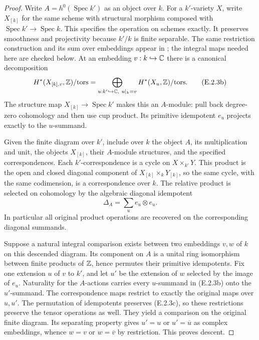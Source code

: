 \begin{proof}
Write $A=h^0(\operatorname{Spec}k')$ as an object over $k$. For a $k'$-variety $X$, write $X_{[k]}$ for the same scheme with structural morphism composed with $\operatorname{Spec}k'\to\operatorname{Spec}k$. This specifies the operation on schemes exactly. It preserves smoothness and projectivity because $k'/k$ is finite separable. The same restriction construction and its sum over embeddings appear in \cite[Example 0.1.1, p.~314, and (0.5.1), p.~316]{Deligne1979}; the integral maps needed here are checked below. At an embedding $v:k\hookrightarrow\mathbb C$ there is a canonical decomposition
\[
 H^*(X_{[k],v},\mathbb Z)/\mathrm{tors}
   =\bigoplus_{u:k'\hookrightarrow\mathbb C,\ u|_k=v}
                   H^*(X_u,\mathbb Z)/\mathrm{tors}.
 \tag{E.2.3b}
\]
The structure map $X_{[k]}\to\operatorname{Spec}k'$ makes this an $A$-module: pull back degree-zero cohomology and then use cup product. Its primitive idempotent $e_u$ projects exactly to the $u$-summand.

Given the finite diagram over $k'$, include over $k$ the object $A$, its multiplication and unit, the objects $X_{[k]}$, their $A$-module structures, and the specified correspondences. Each $k'$-correspondence is a cycle on $X\times_{k'}Y$. This product is the open and closed diagonal component of $X_{[k]}\times_kY_{[k]}$, so the same cycle, with the same codimension, is a correspondence over $k$. The relative product is selected on cohomology by the algebraic diagonal idempotent
\[
 \Delta_A=\sum_u e_u\otimes e_u.
 \tag{E.2.3c}
\]
In particular all original product operations are recovered on the corresponding diagonal summands.

Suppose a natural integral comparison exists between two embeddings $v,w$ of $k$ on this descended diagram. Its component on $A$ is a unital ring isomorphism between finite products of $\mathbb Z$, hence permutes their primitive idempotents. Fix one extension $u$ of $v$ to $k'$, and let $u'$ be the extension of $w$ selected by the image of $e_u$. Naturality for the $A$-actions carries every $u$-summand in (E.2.3b) onto the $u'$-summand. The correspondence maps restrict to exactly the original maps over $u,u'$. The permutation of idempotents preserves (E.2.3c), so these restrictions preserve the tensor operations as well. They yield a comparison on the original finite diagram. Its separating property gives $u'=u$ or $u'=\overline u$ as complex embeddings, whence $w=v$ or $w=\overline v$ by restriction. This proves descent.


\end{proof}
